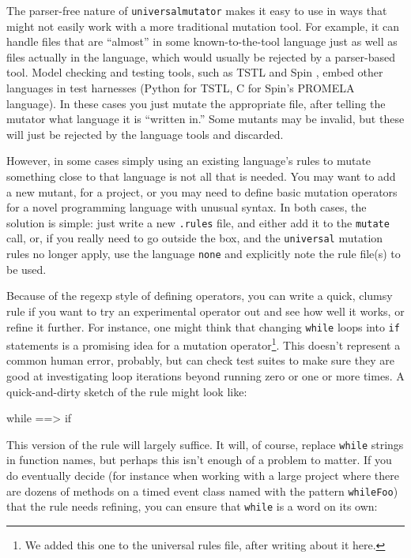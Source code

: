 The parser-free nature of {\tt universalmutator} makes it easy to
use in ways that might not easily
work with a more traditional mutation tool.  For example, it can
handle files that are ``almost'' in some known-to-the-tool language
just as well as files actually in the language, which would usually be
rejected by a parser-based tool.  Model checking and
testing tools, such as TSTL  and Spin \cite{SPIN}, embed other
languages in test harnesses (Python for TSTL, C for Spin's PROMELA
language).  In these cases you just mutate the appropriate file, after
telling the mutator what language it is ``written in.''  Some mutants
may be invalid, but these will just be rejected by the language tools
and discarded.

However, in some cases simply using an existing language's rules to
mutate something close to that language is not
all that is needed.  You may want to add a new mutant, for a project,
or you may need to define basic mutation operators for a novel
programming language with unusual syntax.  In both cases, the solution
is simple:  just write a new {\tt .rules} file, and either add it to
the {\tt mutate} call, or, if you really need to go outside the box,
and the {\tt universal} mutation rules no longer apply, use the
language {\tt none} and explicitly note the rule file(s) to be used.

Because of the regexp style of defining operators, you can write a
quick, clumsy rule if you want to try an experimental operator out and
see how well it works, or refine it further.  For instance, one might
think that changing {\tt while} loops into {\tt if} statements is a
promising idea for a mutation operator\footnote{We added this one to
  the universal rules file, after writing about it here.}.  This doesn't represent a common human error,
probably, but can check test suites to make sure they are good at
investigating loop iterations beyond running zero or one or more
times.  A quick-and-dirty sketch of the rule might look like:

\begin{code}
while ==> if 
\end{code}

This version of the rule will largely suffice.  It will, of
course, replace {\tt while} strings in function names, but perhaps
this isn't enough of a problem to matter.  If you do eventually decide (for instance when
working with a large project where there are dozens of methods on a
timed event class named with the pattern {\tt whileFoo}) that the rule
needs refining, you can ensure that {\tt while} is a word on its own:


